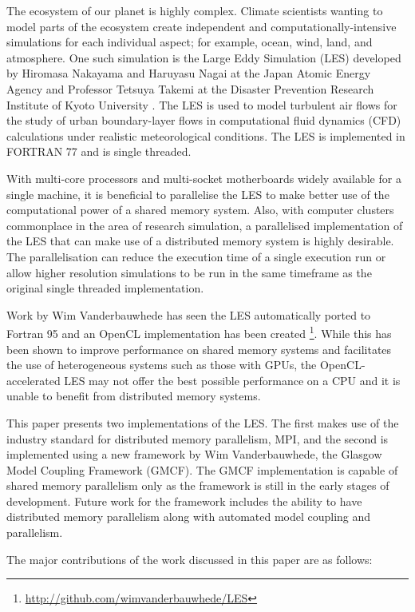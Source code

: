 The ecosystem of our planet is highly complex. Climate scientists wanting to
model parts of the ecosystem create independent and computationally-intensive
simulations for each individual aspect; for example, ocean, wind, land, and
atmosphere. One such simulation is the Large Eddy Simulation (LES) developed by
Hiromasa Nakayama and Haruyasu Nagai at the Japan Atomic Energy Agency and
Professor Tetsuya Takemi at the Disaster Prevention Research Institute of Kyoto
University \cite{Nakayama2011,Nakayama2012}. The LES is used to model turbulent
air flows for the study of urban boundary-layer flows in computational fluid
dynamics (CFD) calculations under realistic meteorological conditions. The LES
is implemented in FORTRAN 77 and is single threaded.

With multi-core processors and multi-socket motherboards widely available for a
single machine, it is beneficial to parallelise the LES to make better use of
the computational power of a shared memory system. Also, with computer clusters
commonplace in the area of research simulation, a parallelised implementation of
the LES that can make use of a distributed memory system is highly desirable.
The parallelisation can reduce the execution time of a single execution run or
allow higher resolution simulations to be run in the same timeframe as the
original single threaded implementation.

Work by Wim Vanderbauwhede has seen the LES automatically ported to Fortran 95
and an OpenCL implementation has been created
\footnote{\url{http://github.com/wimvanderbauwhede/LES}}. While this has been
shown to improve performance on shared memory systems and facilitates the use of
heterogeneous systems such as those with GPUs, the OpenCL-accelerated LES may
not offer the best possible performance on a CPU and it is unable to benefit
from distributed memory systems.

This paper presents two implementations of the LES. The first makes use of the
industry standard for distributed memory parallelism, MPI, and the second is
implemented using a new framework by Wim Vanderbauwhede, the Glasgow Model
Coupling Framework (GMCF). The GMCF implementation is capable of shared memory
parallelism only as the framework is still in the early stages of development.
Future work for the framework includes the ability to have distributed memory
parallelism along with automated model coupling and parallelism.

The major contributions of the work discussed in this paper are as follows:

